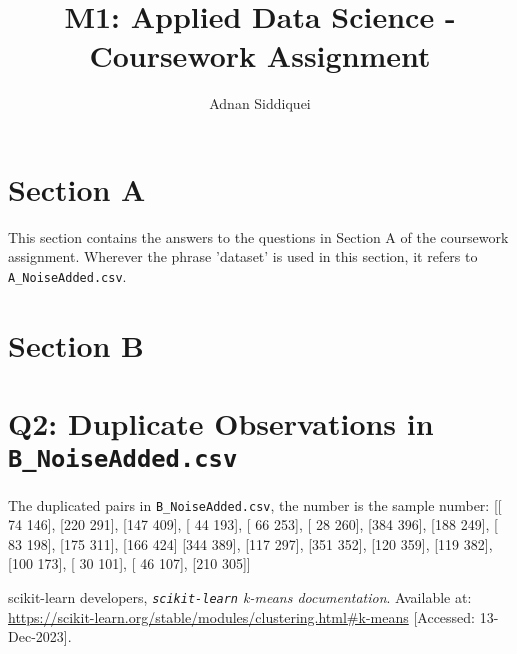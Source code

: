 \documentclass[a4paper,11pt]{article}
\title{\boldmath M1: Applied Data Science - Coursework Assignment}
\author{Adnan Siddiquei}
\affiliation{University of Cambridge}
\newcommand{\inlinecode}[1]{\lstinline{#1}}
\begin{document}
\maketitle
\flushbottom


\section{Section A}\label{sec:section-a}
This section contains the answers to the questions in Section A of the coursework assignment.
Wherever the phrase 'dataset' is used in this section, it refers to \inlinecode{A_NoiseAdded.csv}.




\section{Section B}\label{sec:section-b}

\appendix

\section{Q2: Duplicate Observations in \inlinecode{B_NoiseAdded.csv}}\label{appendix:q2}
The duplicated pairs in \inlinecode{B_NoiseAdded.csv}, the number is the sample number:
[[ 74 146], [220 291], [147 409], [ 44 193], [ 66 253], [ 28 260], [384 396], [188 249], [ 83 198], [175 311], [166 424]
 [344 389], [117 297], [351 352], [120 359], [119 382], [100 173], [ 30 101], [ 46 107], [210 305]]


\begin{thebibliography}{99}

scikit-learn developers,
\textit{\inlinecode{scikit-learn} k-means documentation}.
Available at: \url{https://scikit-learn.org/stable/modules/clustering.html#k-means}
[Accessed: 13-Dec-2023].

\end{thebibliography}
\end{document}
